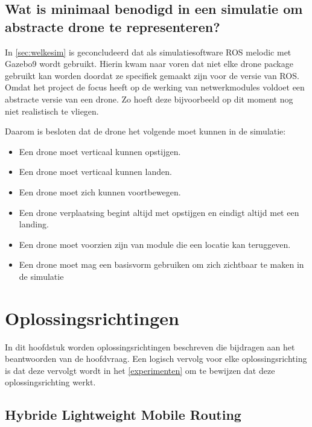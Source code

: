\documentclass[a4paper, 11pt, oneside]{report}
\begin{document}
 


\section[minimaal benodigd om een abstracte drone te representeren]{Wat is minimaal benodigd in een simulatie om abstracte drone te representeren?}
\label{sec:dronekeuze}

In \autoref{sec:welkesim} is geconcludeerd dat als simulatiesoftware ROS melodic met Gazebo9 wordt gebruikt.
Hierin kwam naar voren dat niet elke drone package gebruikt kan worden doordat ze specifiek gemaakt zijn voor de versie van ROS.
Omdat het project de focus heeft op de werking van netwerkmodules voldoet een abstracte versie van een drone.
Zo hoeft deze bijvoorbeeld op dit moment nog niet realistisch te vliegen.

Daarom is besloten dat de drone het volgende moet kunnen in de simulatie:

\begin{itemize}
	\item Een drone moet verticaal kunnen opstijgen.
	\item Een drone moet verticaal kunnen landen.
	\item Een drone moet zich kunnen voortbewegen.
	\item Een drone verplaatsing begint altijd met opstijgen en eindigt altijd met een landing.
	\item Een drone moet voorzien zijn van module die een locatie kan teruggeven. 
	\item Een drone moet mag een basisvorm gebruiken om zich zichtbaar te maken in de simulatie
\end{itemize}


\chapter{Oplossingsrichtingen}


In dit hoofdstuk worden oplossingsrichtingen beschreven die bijdragen aan het beantwoorden van de hoofdvraag. 
Een logisch vervolg voor elke oplossingsrichting is dat deze vervolgt wordt in het \autoref{experimenten}  om te bewijzen dat deze oplossingsrichting werkt.

\section{Hybride Lightweight Mobile Routing}\label{sec:hybride-lightweight-mobile-routing}
\end{document}
